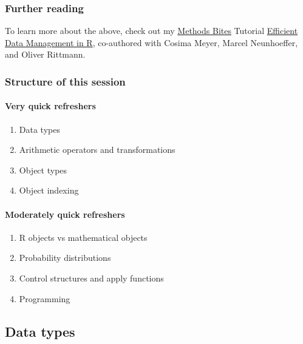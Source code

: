 \documentclass[
  11pt,
]{article}
\providecommand{\tightlist}{%
  \setlength{\itemsep}{0pt}\setlength{\parskip}{0pt}}
\begin{document}
\hypertarget{further-reading}{%
\subsubsection{Further reading}\label{further-reading}}

To learn more about the above, check out my \href{https://www.mzes.uni-mannheim.de/socialsciencedatalab/}{Methods Bites} Tutorial \href{https://www.mzes.uni-mannheim.de/socialsciencedatalab/article/efficient-data-r/}{Efficient Data Management in R}, co-authored with Cosima Meyer, Marcel Neunhoeffer, and Oliver Rittmann.

\hypertarget{structure-of-this-session}{%
\subsubsection{Structure of this session}\label{structure-of-this-session}}

\hypertarget{very-quick-refreshers}{%
\paragraph{Very quick refreshers}\label{very-quick-refreshers}}

\begin{enumerate}
\def\labelenumi{\arabic{enumi}.}
\tightlist
\item
  Data types
\item
  Arithmetic operators and transformations
\item
  Object types
\item
  Object indexing
\end{enumerate}

\hypertarget{moderately-quick-refreshers}{%
\paragraph{Moderately quick refreshers}\label{moderately-quick-refreshers}}

\begin{enumerate}
\def\labelenumi{\arabic{enumi}.}
\tightlist
\item
  R objects vs mathematical objects
\item
  Probability distributions
\item
  Control structures and apply functions
\item
  Programming
\end{enumerate}

\hypertarget{data-types}{%
\subsection{Data types}\label{data-types}}
\end{document}

